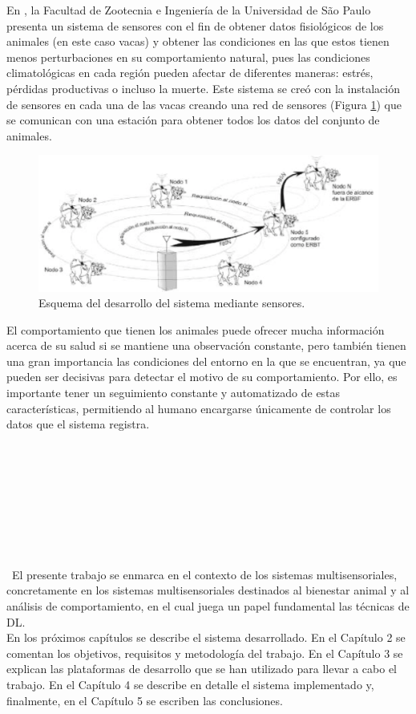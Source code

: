 En \cite{arce09}, la Facultad de Zootecnia e Ingeniería de la Universidad de São Paulo presenta un sistema de sensores con el fin de obtener datos fisiológicos de los animales (en este caso vacas) y obtener las condiciones en las que estos tienen menos perturbaciones en su comportamiento natural, pues las condiciones climatológicas en cada región pueden afectar de diferentes maneras: estrés, pérdidas productivas o incluso la muerte. Este sistema se creó con la instalación de sensores en cada una de las vacas creando una red de sensores (Figura \ref{fig:saopaulo}) que se comunican con una estación para obtener todos los datos del conjunto de animales.\\
\begin{figure} [h!]
  \begin{center}
    \includegraphics[width=14cm]{figs/saopaulo}
  \end{center}
  \caption{Esquema del desarrollo del sistema mediante sensores.}
  \label{fig:saopaulo}
\end{figure}

El comportamiento que tienen los animales puede ofrecer mucha información acerca de su salud si se mantiene una observación constante, pero también tienen una gran importancia las condiciones del entorno en la que se encuentran, ya que pueden ser decisivas para detectar el motivo de su comportamiento. Por ello, es importante tener un seguimiento constante y automatizado de estas características, permitiendo al humano encargarse únicamente de controlar los datos que el sistema registra.\\
\

\

\

\

\

\
El presente trabajo se enmarca en el contexto de los sistemas multisensoriales, concretamente en los sistemas multisensoriales destinados al bienestar animal y al análisis de comportamiento, en el cual juega un papel fundamental las técnicas de DL.\\

En los próximos capítulos se describe el sistema desarrollado. En el Capítulo 2 se comentan los objetivos, requisitos y metodología del trabajo. En el Capítulo 3 se explican las plataformas de desarrollo que se han utilizado para llevar a cabo el trabajo. En el Capítulo 4 se describe en detalle el sistema implementado y, finalmente, en el Capítulo 5 se escriben las conclusiones.